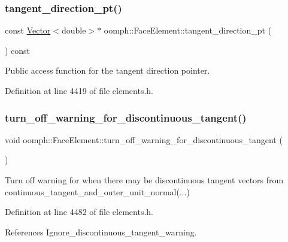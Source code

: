 \subsubsection{\texorpdfstring{tangent\+\_\+direction\+\_\+pt()}{tangent\_direction\_pt()}}
{\footnotesize\ttfamily const \hyperlink{classoomph_1_1Vector}{Vector}$<$double$>$$\ast$ oomph\+::\+Face\+Element\+::tangent\+\_\+direction\+\_\+pt (\begin{DoxyParamCaption}{ }\end{DoxyParamCaption}) const\hspace{0.3cm}{\ttfamily [inline]}}



Public access function for the tangent direction pointer. 



Definition at line 4419 of file elements.\+h.

\mbox{\label{classoomph_1_1FaceElement_a4c3159cad8dd11618c201d8b66651cd3}} 
\subsubsection{\texorpdfstring{turn\+\_\+off\+\_\+warning\+\_\+for\+\_\+discontinuous\+\_\+tangent()}{turn\_off\_warning\_for\_discontinuous\_tangent()}}
{\footnotesize\ttfamily void oomph\+::\+Face\+Element\+::turn\+\_\+off\+\_\+warning\+\_\+for\+\_\+discontinuous\+\_\+tangent (\begin{DoxyParamCaption}{ }\end{DoxyParamCaption})\hspace{0.3cm}{\ttfamily [inline]}}



Turn off warning for when there may be discontinuous tangent vectors from continuous\+\_\+tangent\+\_\+and\+\_\+outer\+\_\+unit\+\_\+normal(...) 



Definition at line 4482 of file elements.\+h.



References Ignore\+\_\+discontinuous\+\_\+tangent\+\_\+warning.

